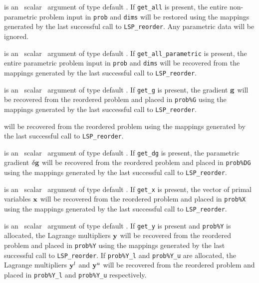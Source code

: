 \documentclass{galahad}
\newcommand{\packagename}{LSP}
\begin{document}
\begin{description}
is an \optional\ scalar \intentin\ argument of type default \logical. 
If {\tt get\_all} is present, the entire non-parametric problem 
input in {\tt prob} and {\tt dims} will be restored using the 
mappings generated by the last successful call to {\tt \packagename\_reorder}. 
Any parametric data will be ignored.

is an \optional\ scalar \intentin\ argument of type default \logical. 
If {\tt get\_all\_parametric} is present, the entire parametric problem 
input in {\tt prob} and {\tt dims} will be recovered from the 
mappings generated by the last successful call to {\tt \packagename\_reorder}. 
 
is an \optional\ scalar \intentin\ argument of type default \logical. 
If {\tt get\_g} is present, the gradient ${\mathbf{g}}$
will be recovered from  the reordered problem and placed in {\tt prob\%G} 
using the mappings generated by the last successful call to 
{\tt \packagename\_reorder}. 

will be recovered from  the reordered problem using the 
mappings generated by the last successful call to {\tt \packagename\_reorder}. 
 
is an \optional\ scalar \intentin\ argument of type default \logical. 
If {\tt get\_dg} is present, the parametric gradient $\delta {\mathbf{g}}$
will be recovered from  the reordered problem and placed in {\tt prob\%DG} 
using the mappings generated by the last successful call to 
{\tt \packagename\_reorder}. 
 
is an \optional\ scalar \intentin\ argument of type default \logical. 
If {\tt get\_x} is present, the vector of primal variables ${\mathbf{x}}$
will be recovered from  the reordered problem and placed in {\tt prob\%X} 
using the mappings generated by the last successful call to 
{\tt \packagename\_reorder}. 
 
is an \optional\ scalar \intentin\ argument of type default \logical. 
If {\tt get\_y} is present and {\tt prob\%Y} is allocated, 
the Lagrange multipliers 
${\mathbf{y}}$ will be recovered from  the reordered problem and placed in {\tt prob\%Y} 
using the mappings generated by the last successful call to 
{\tt \packagename\_reorder}. If {\tt prob\%Y\_l} and {\tt prob\%Y\_u} 
are allocated, the Lagrange multipliers 
${\mathbf{y}}^l$ and ${\mathbf{y}}^u$ will be recovered from  the reordered problem and 
placed in {\tt prob\%Y\_l} and {\tt prob\%Y\_u} respectively.
 

\end{description}
\end{document}

